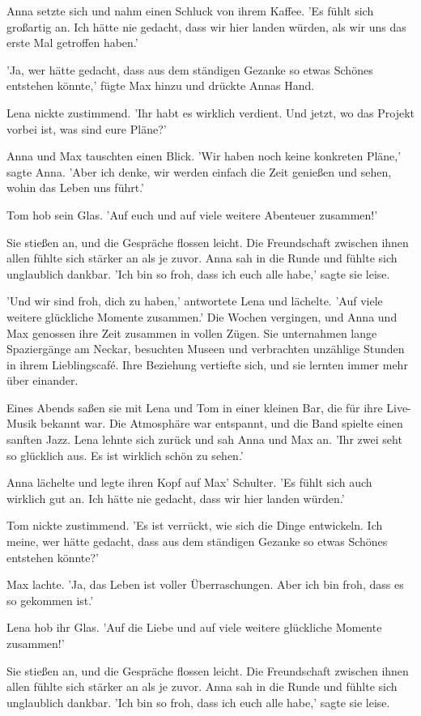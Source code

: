 \documentclass[12pt]{article}
\begin{document}
Anna setzte sich und nahm einen Schluck von ihrem Kaffee. 'Es fühlt sich großartig an. Ich hätte nie gedacht, dass wir hier landen würden, als wir uns das erste Mal getroffen haben.'

'Ja, wer hätte gedacht, dass aus dem ständigen Gezanke so etwas Schönes entstehen könnte,' fügte Max hinzu und drückte Annas Hand.

Lena nickte zustimmend. 'Ihr habt es wirklich verdient. Und jetzt, wo das Projekt vorbei ist, was sind eure Pläne?'

Anna und Max tauschten einen Blick. 'Wir haben noch keine konkreten Pläne,' sagte Anna. 'Aber ich denke, wir werden einfach die Zeit genießen und sehen, wohin das Leben uns führt.'

Tom hob sein Glas. 'Auf euch und auf viele weitere Abenteuer zusammen!'

Sie stießen an, und die Gespräche flossen leicht. Die Freundschaft zwischen ihnen allen fühlte sich stärker an als je zuvor. Anna sah in die Runde und fühlte sich unglaublich dankbar. 'Ich bin so froh, dass ich euch alle habe,' sagte sie leise.

'Und wir sind froh, dich zu haben,' antwortete Lena und lächelte. 'Auf viele weitere glückliche Momente zusammen.' Die Wochen vergingen, und Anna und Max genossen ihre Zeit zusammen in vollen Zügen. Sie unternahmen lange Spaziergänge am Neckar, besuchten Museen und verbrachten unzählige Stunden in ihrem Lieblingscafé. Ihre Beziehung vertiefte sich, und sie lernten immer mehr über einander.

Eines Abends saßen sie mit Lena und Tom in einer kleinen Bar, die für ihre Live-Musik bekannt war. Die Atmosphäre war entspannt, und die Band spielte einen sanften Jazz. Lena lehnte sich zurück und sah Anna und Max an. 'Ihr zwei seht so glücklich aus. Es ist wirklich schön zu sehen.'

Anna lächelte und legte ihren Kopf auf Max' Schulter. 'Es fühlt sich auch wirklich gut an. Ich hätte nie gedacht, dass wir hier landen würden.'

Tom nickte zustimmend. 'Es ist verrückt, wie sich die Dinge entwickeln. Ich meine, wer hätte gedacht, dass aus dem ständigen Gezanke so etwas Schönes entstehen könnte?'

Max lachte. 'Ja, das Leben ist voller Überraschungen. Aber ich bin froh, dass es so gekommen ist.'

Lena hob ihr Glas. 'Auf die Liebe und auf viele weitere glückliche Momente zusammen!'

Sie stießen an, und die Gespräche flossen leicht. Die Freundschaft zwischen ihnen allen fühlte sich stärker an als je zuvor. Anna sah in die Runde und fühlte sich unglaublich dankbar. 'Ich bin so froh, dass ich euch alle habe,' sagte sie leise.
\end{document}
